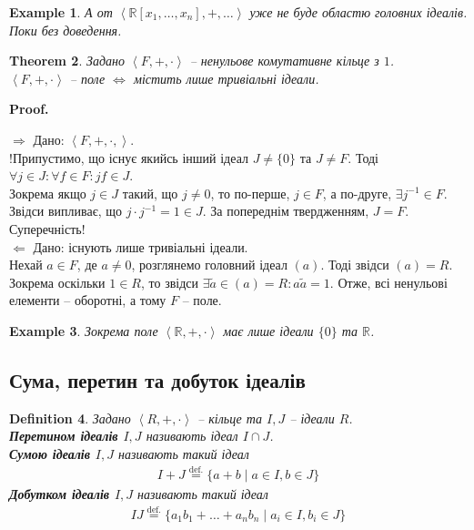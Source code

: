 \documentclass[a4paper, 10pt]{article}
\makeatletter
\def\rightproof{$\boxed{\Rightarrow}$ }
\def\leftproof{$\boxed{\Leftarrow}$ }
\theoremstyle{theoremdd}
\newtheorem{theorem}{Theorem}[subsection]
\theoremstyle{theoremdd}
\newtheorem{definition}[theorem]{Definition}
\theoremstyle{theoremdd}
\theoremstyle{theoremdd}
\theoremstyle{theoremdd}
\newtheorem{example}[theorem]{Example}
\theoremstyle{theoremdd}
\theoremstyle{theoremdd}
\theoremstyle{theoremdd}
\theoremstyle{theoremdd}
\theoremstyle{theoremdd}
\theoremstyle{theoremdd}
\theoremstyle{theoremdd}
\theoremstyle{theoremdd}
\theoremstyle{theoremdd}
\theoremstyle{theoremdd}
\renewenvironment{proof}[1][Proof.\\]{\par
\pushQED{\hfill \qed}%
\normalfont \topsep6\p@\@plus6\p@\relax
\trivlist
\item\relax
{\bfseries
#1\@addpunct{.}}\hspace\labelsep\ignorespaces
}{%
\popQED\endtrivlist\@endpefalse
}
\newcommand{\eqbydef}{\overset{\text{def.}}{=}}
\makeatother
\begin{document}
\begin{example}
А от $\left<\mathbb{R}[x_1,\dots,x_n], +, \dots \right>$ уже не буде областю головних ідеалів.\\
\textit{Поки без доведення}.
\end{example}

\begin{theorem}
Задано $\left< F,+,\cdot\right>$ -- ненульове комутативне кільце з $1$.\\
$\left<F,+,\cdot\right>$ -- поле $\iff$ містить лише тривіальні ідеали.
\end{theorem}

\begin{proof}
\rightproof Дано: $\left<F,+,\cdot,\right>$.\\
!Припустимо, що існує якийсь інший ідеал $J \neq \{0\}$ та $J \neq F$. Тоді\\
$\forall j \in J: \forall f \in F: jf \in J$.\\
Зокрема якщо $j \in J$ такий, що $j \neq 0$, то по-перше, $j \in F$, а по-друге, $\exists j^{-1} \in F$. Звідси випливає, що $j \cdot j^{-1} = 1 \in J$. За попереднім твердженням, $J = F$. Суперечність!
\bigskip \\
\leftproof Дано: існують лише тривіальні ідеали.\\
Нехай $a \in F$, де $a \neq 0$, розглянемо головний ідеал $(a)$. Тоді звідси $(a) = R$. Зокрема оскільки $1 \in R$, то звідси $\exists \tilde{a} \in (a) = R: a \tilde{a} = 1$. Отже, всі ненульові елементи -- оборотні, а тому $F$ -- поле.
\end{proof}

\begin{example}
Зокрема поле $\left< \mathbb{R},+,\cdot \right>$ має лише ідеали $\{0\}$ та $\mathbb{R}$.
\end{example}

\subsection{Сума, перетин та добуток ідеалів}
\begin{definition}
Задано $\left<R,+,\cdot\right>$ -- кільце та $I,J$ -- ідеали $R$.\\
\textbf{Перетином ідеалів $I,J$} називають ідеал $I \cap J$.\\
\textbf{Сумою ідеалів $I,J$} називають такий ідеал
\begin{align*}
I+J \eqbydef \{ a+b \mid a \in I, b \in J \}
\end{align*}
\textbf{Добутком ідеалів $I,J$} називають такий ідеал
\begin{align*}
IJ \eqbydef \{ a_1 b_1 + \dots + a_n b_n \mid a_i \in I, b_i \in J\}
\end{align*}
\end{definition}
\end{document}
